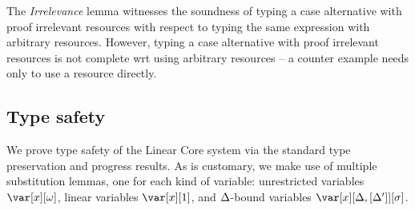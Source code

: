 \documentclass[acmsmall,review,anonymous]{acmart}
\begin{document}


\WHNFConvSoundness

The \emph{Irrelevance} lemma witnesses the soundness of typing a
case alternative with proof irrelevant resources with respect to
typing the same expression with arbitrary resources. However, typing
a case alternative with proof irrelevant resources is not complete wrt using
arbitrary resources -- a counter example needs only to use a resource
directly.


\subsection{Type safety\label{sec:type-safety-meta}}

We prove type safety of the Linear Core system via the standard type
preservation and progress results. As is customary, we make use of multiple
substitution lemmas, one for each kind of variable: unrestricted variables
$\xo$, linear variables $\xl$, and $\Delta$-bound variables $\xD$.
\end{document}
